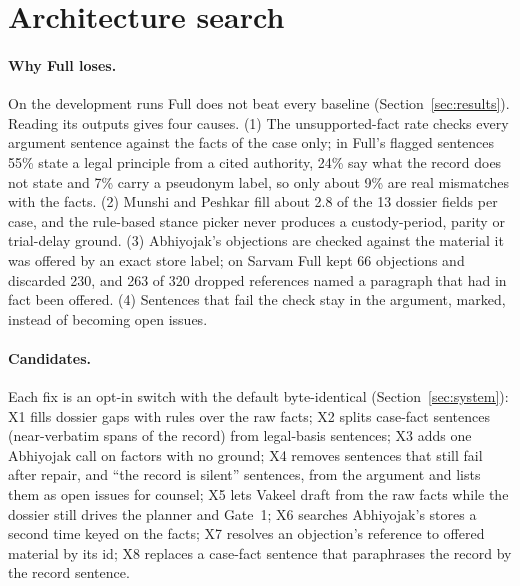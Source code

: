 \section{Architecture search}
\label{sec:arch}

\paragraph{Why Full loses.} On the development runs Full does not beat every baseline (Section~\ref{sec:results}). Reading its outputs gives four causes. (1) The unsupported-fact rate checks every argument sentence against the facts of the case only; in Full's flagged sentences 55\% state a legal principle from a cited authority, 24\% say what the record does not state and 7\% carry a pseudonym label, so only about 9\% are real mismatches with the facts. (2) Munshi and Peshkar fill about 2.8 of the 13 dossier fields per case, and the rule-based stance picker never produces a custody-period, parity or trial-delay ground. (3) Abhiyojak's objections are checked against the material it was offered by an exact store label; on Sarvam Full kept 66 objections and discarded 230, and 263 of 320 dropped references named a paragraph that had in fact been offered. (4) Sentences that fail the check stay in the argument, marked, instead of becoming open issues.

\paragraph{Candidates.} Each fix is an opt-in switch with the default byte-identical (Section~\ref{sec:system}): X1 fills dossier gaps with rules over the raw facts; X2 splits case-fact sentences (near-verbatim spans of the record) from legal-basis sentences; X3 adds one Abhiyojak call on factors with no ground; X4 removes sentences that still fail after repair, and ``the record is silent'' sentences, from the argument and lists them as open issues for counsel; X5 lets Vakeel draft from the raw facts while the dossier still drives the planner and Gate~1; X6 searches Abhiyojak's stores a second time keyed on the facts; X7 resolves an objection's reference to offered material by its id; X8 replaces a case-fact sentence that paraphrases the record by the record sentence.

